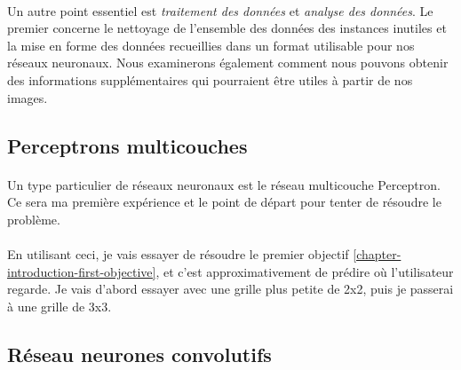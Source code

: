 \paragraph{}
Un autre point essentiel est \emph{traitement des données} et \emph{analyse des données}.
Le premier concerne le nettoyage de l'ensemble des données des instances inutiles et la mise en forme des données recueillies dans un format utilisable pour nos réseaux neuronaux.
Nous examinerons également comment nous pouvons obtenir des informations supplémentaires qui pourraient être utiles à partir de nos images.

\subsection{Perceptrons multicouches}
\paragraph{}
Un type particulier de réseaux neuronaux est le réseau multicouche Perceptron.
Ce sera ma première expérience et le point de départ pour tenter de résoudre le problème.

\paragraph{}
En utilisant ceci, je vais essayer de résoudre le premier objectif \ref{chapter-introduction-first-objective}, et c'est approximativement de prédire où l'utilisateur regarde.
Je vais d'abord essayer avec une grille plus petite de 2x2, puis je passerai à une grille de 3x3.

\subsection{Réseau neurones convolutifs}
